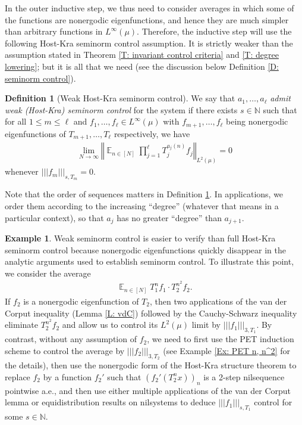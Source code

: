 \documentclass[11pt]{amsart}
\theoremstyle{definition}
\newtheorem{definition}[lemma]{Definition}
\newtheorem{example}[lemma]{Example}
\DeclareMathOperator*{\E}{\mathbb{E}}
\newcommand{\N}{{\mathbb N}}
\newcommand{\norm}[1]{\left\Vert #1\right\Vert}
\newcommand{\nnorm}[1]{\lvert\!|\!| #1|\!|\!\rvert}
\newcommand{\1}{{\mathbf{1}}}
\begin{document}
In the outer inductive step, we thus need to consider averages in which some of the functions are nonergodic eigenfunctions, and hence they are much simpler than arbitrary functions in $L^\infty(\mu)$. Therefore, the inductive step will use the following Host-Kra seminorm control assumption. It is strictly weaker than the assumption stated in Theorem \ref{T: invariant control criteria} and \ref{T: degree lowering}; but it is all that we need (see the discussion below Definition \ref{D: seminorm control}).
\begin{definition}[Weak Host-Kra seminorm control]\label{D: weak control}
    We say that $a_1, \ldots, a_\ell$ \emph{admit weak (Host-Kra) seminorm control} for the system if there exists $s\in\N$ such that for all $1\leq m\leq \ell$ and $f_1, \ldots, f_\ell\in L^\infty(\mu)$ with $f_{m+1}, \ldots, f_\ell$ being nonergodic eigenfunctions of $T_{m+1}, \ldots, T_\ell$ respectively, we have
    \begin{align*}
        \lim_{N\to\infty}\norm{\E_{n\in[N]}\prod_{j=1}^\ell T_j^{{a_{j}(n)}}f_j}_{L^2(\mu)} = 0
    \end{align*}
    whenever $\nnorm{f_m}_{s, T_m} = 0$. 
\end{definition}
Note that the order of sequences matters in Definition \ref{D: weak control}. In applications, we order them according to the increasing ``degree'' (whatever that means in a particular context), so that $a_j$ has no greater ``degree'' than $a_{j+1}$.
\begin{example}
Weak seminorm control is easier to verify than full Host-Kra seminorm control because nonergodic eigenfunctions quickly disappear in the analytic arguments used to establish seminorm control. To illustrate this point, we 
    consider the average
    \begin{align*}
        \E_{n\in[N]}T_1^n f_1\cdot T_2^{n^2}f_2.
    \end{align*}
    If $f_2$ is a nonergodic eigenfunction of $T_2$, then two applications of the van der Corput inequality (Lemma \ref{L: vdC}) followed by the Cauchy-Schwarz inequality eliminate $T_2^{n^2}f_2$ and allow us to control its $L^2(\mu)$ limit by $\nnorm{f_1}_{3, T_1}$. By contrast, without any assumption of $f_2$, we need to first use the PET induction scheme to control the average by $\nnorm{f_2}_{3, T_2}$ (see Example \ref{Ex: PET n, n^2} for the details), then use the nonergodic form of the Host-Kra structure theorem to replace $f_2$ by a function $f_2'$ such that $(f_2'(T_2^n x))_n$ is a 2-step nilsequence pointwise a.e., and then use either multiple applications of the van der Corput lemma or equidistribution results on nilsystems to deduce $\nnorm{f_1}_{s, T_1}$ control for some $s\in\N$. 
\end{example}
\end{document}
